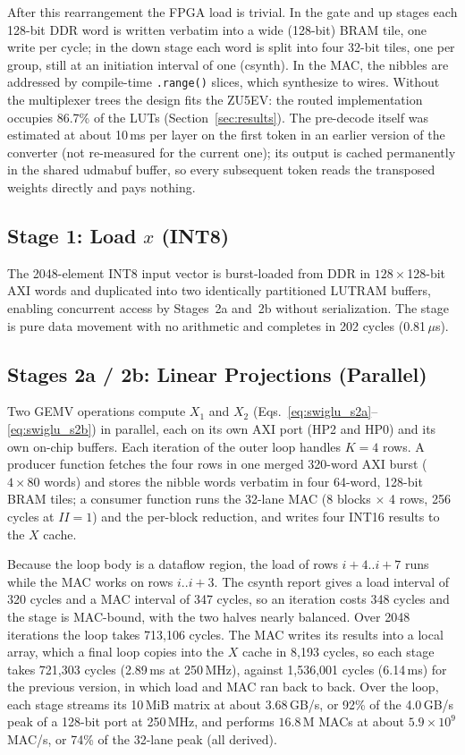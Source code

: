 After this rearrangement the FPGA load is trivial. In the gate and up stages each
128-bit DDR word is written verbatim into a wide (128-bit) BRAM tile, one write per
cycle; in the down stage each word is split into four 32-bit tiles, one per group, still
at an initiation interval of one (csynth). In the MAC, the nibbles are addressed by
compile-time \texttt{.range()} slices, which synthesize to wires. Without the
multiplexer trees the design fits the ZU5EV: the routed implementation occupies 86.7\%
of the LUTs (Section~\ref{sec:results}). The pre-decode itself was estimated at about
10\,ms per layer on the first token in an earlier version of the converter (not
re-measured for the current one); its output is cached permanently in the shared
udmabuf buffer, so every subsequent token reads the transposed weights directly and
pays nothing.

\subsection{Stage 1: Load $x$ (INT8)}
The 2048-element INT8 input vector is burst-loaded from DDR in $128\times$128-bit AXI
words and duplicated into two identically partitioned LUTRAM buffers, enabling
concurrent access by Stages~2a and~2b without serialization. The stage is pure data
movement with no arithmetic and completes in 202 cycles (0.81\,$\mu$s).

\subsection{Stages 2a / 2b: Linear Projections (Parallel)}
\label{subsec:stage2}
Two GEMV operations compute $X_1$ and $X_2$
(Eqs.~\eqref{eq:swiglu_s2a}--\eqref{eq:swiglu_s2b}) in parallel, each on its own AXI
port (HP2 and HP0) and its own on-chip buffers. Each iteration of the outer loop handles
$K=4$ rows. A producer function fetches the four rows in one merged 320-word AXI burst
($4\times80$ words) and stores the nibble words verbatim in four 64-word, 128-bit BRAM
tiles; a consumer function runs the 32-lane MAC (8 blocks $\times$ 4 rows, 256 cycles at
$II=1$) and the per-block reduction, and writes four INT16 results to the $X$ cache.

Because the loop body is a dataflow region, the load of rows $i{+}4..i{+}7$ runs while
the MAC works on rows $i..i{+}3$. The csynth report gives a load interval of 320 cycles
and a MAC interval of 347 cycles, so an iteration costs 348 cycles and the stage is
MAC-bound, with the two halves nearly balanced. Over 2048 iterations the loop takes
713,106 cycles. The MAC writes its results into a local array, which a final loop copies
into the $X$ cache in 8,193 cycles, so each stage takes 721,303 cycles (2.89\,ms at
250\,MHz), against 1,536,001 cycles (6.14\,ms) for the previous version, in which load
and MAC ran back to back. Over the loop, each stage streams its 10\,MiB matrix at about
3.68\,GB/s, or 92\% of the 4.0\,GB/s peak of a 128-bit port at 250\,MHz, and performs
$16.8$\,M MACs at about $5.9\times10^{9}$ MAC/s, or 74\% of the 32-lane peak (all
derived).

